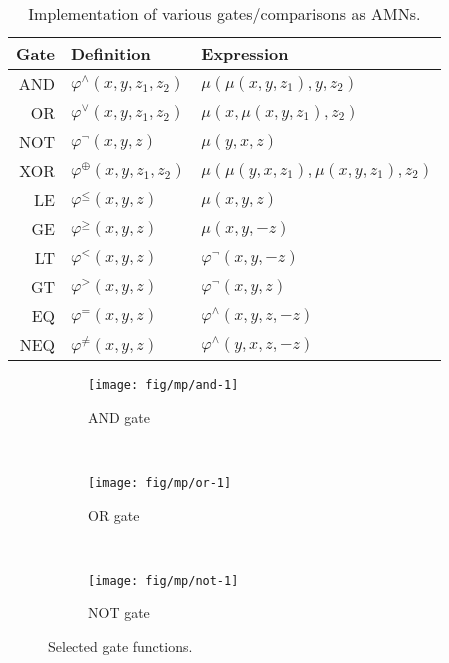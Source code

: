 \documentclass[10pt]{article}
\newcommand{\amn}{\varphi}
\theoremstyle{remark}
\theoremstyle{definition}
\theoremstyle{plain}
\begin{document}

\begin{table}[htbp]
	\centering
	\begin{tabular}{r|l|l}
		\textbf{Gate} & \textbf{Definition} & \textbf{Expression}\\
		\hline
		AND & $\amn^\wedge(x,y,z_1,z_2)$ & $\mu(\mu(x,y,z_1),y,z_2)$\\
		OR & $\amn^\vee(x,y,z_1,z_2)$ & $\mu(x,\mu(x,y,z_1),z_2)$\\
		NOT & $\amn^\neg(x,y,z)$ & $\mu(y, x, z)$\\
		XOR & $\amn^{\oplus}(x,y,z_1,z_2)$ & $\mu(\mu(y,x,z_1),\mu(x,y,z_1),z_2)$ \\
		\hline
		LE & $\amn^\leq(x,y,z)$ & $\mu(x,y,z)$\\
		GE & $\amn^\geq(x,y,z)$ & $\mu(x,y,-z)$\\
		LT & $\amn^<(x,y,z)$ & $\amn^\neg(x,y,-z)$\\
		GT & $\amn^>(x,y,z)$ & $\amn^\neg(x,y,z)$\\
		EQ & $\amn^=(x,y,z)$ & $\amn^\wedge(x,y,z,-z)$\\
		NEQ & $\amn^{\neq}(x,y,z)$ & $\amn^\wedge(y,x,z,-z)$
	\end{tabular}
	\caption{Implementation of various gates/comparisons as AMNs.}
	\label{tab:impl_gates}
\end{table}

\begin{figure}[htpb]
	\centering
    \begin{subfigure}{0.3\linewidth}
		\centering
        \texttt{[image: fig/mp/and-1]}
		\caption{AND gate}
		\label{fig:and1}
    \end{subfigure}
	~\quad~
    \begin{subfigure}{0.3\linewidth}
		\centering
        \texttt{[image: fig/mp/or-1]}
		\caption{OR gate}
        \label{fig:or1}
    \end{subfigure}
	~
    \begin{subfigure}{0.3\linewidth}
		\centering
        \texttt{[image: fig/mp/not-1]}
		\caption{NOT gate}
        \label{fig:not1}
    \end{subfigure}
	\caption{Selected gate functions.}
    \label{fig:impl_gates}
\end{figure}
\end{document}
